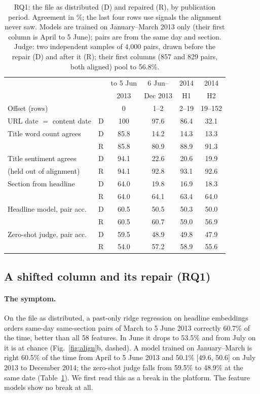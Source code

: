 \documentclass[10pt,a4paper,twocolumn]{article}
\begin{document}
\begin{table}[t]
\centering\footnotesize
\caption{RQ1: the file as distributed (D) and repaired (R), by publication period. Agreement in \%; the last
four rows use signals the alignment never saw. Models are trained on January--March 2013 only (their first
column is April to 5 June); pairs are from the same day and section. Judge: two independent samples of 4{,}000 pairs, drawn before the repair (D) and after it (R); their first columns (857 and 829 pairs, both aligned) pool to 56.8\%.}
\label{tab:align}
\setlength{\tabcolsep}{2.6pt}
\begin{tabular}{@{}llcccc@{}}
\toprule
 & & to 5 Jun & 6 Jun-- & 2014 & 2014 \\
 & & 2013 & Dec 2013 & H1 & H2 \\
\midrule
Offset (rows) & & 0 & 1--2 & 2--19 & 19--152 \\
URL date $=$ content date & D & 100 & 97.6 & 86.4 & 32.1 \\
Title word count agrees & D & 85.8 & 14.2 & 14.3 & 13.3 \\
 & R & 85.8 & 80.9 & 88.9 & 91.3 \\
\midrule
Title sentiment agrees & D & 94.1 & 22.6 & 20.6 & 19.9 \\
\quad (held out of alignment) & R & 94.1 & 92.8 & 93.1 & 92.6 \\
Section from headline & D & 64.0 & 19.8 & 16.9 & 18.3 \\
 & R & 64.0 & 64.1 & 63.4 & 64.0 \\
Headline model, pair acc. & D & 60.5 & 50.5 & 50.3 & 50.0 \\
 & R & 60.5 & 60.7 & 59.0 & 56.9 \\
Zero-shot judge, pair acc. & D & 59.5 & 48.9 & 49.8 & 47.9 \\
 & R & 54.0 & 57.2 & 58.9 & 55.6 \\
\bottomrule
\end{tabular}
\end{table}

\subsection{A shifted column and its repair (RQ1)}
\label{sec:rq1}
\paragraph{The symptom.} On the file as distributed, a past-only ridge regression on headline embeddings orders
same-day same-section pairs of March to 5 June 2013 correctly 60.7\% of the time, better than all 58 features. In June
it drops to 53.5\% and from July on it is at chance (Fig.~\ref{fig:align}b, dashed). A model trained on
January--March is right 60.5\% of the time from April to 5 June 2013 and 50.1\% [49.6, 50.6] on July 2013 to
December 2014; the zero-shot judge falls from 59.5\% to 48.9\% at the same date (Table~\ref{tab:align}). We first read this
as a break in the platform. The feature models show no break at all.
\end{document}

